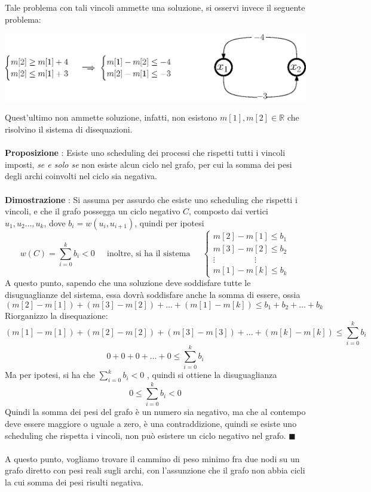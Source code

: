\documentclass[12pt, letterpaper]{article}
\newcommand{\acc}{\\\hphantom{}\\}
\begin{document}
Tale problema con tali vincoli ammette una soluzione, si osservi invece il seguente problema:\begin{center}
    \includegraphics[width=1\textwidth ]{images/scheduling3.eps}
\end{center}
Quest'ultimo non ammette soluzione, infatti, non esistono $m[1],m[2]\in \mathbb{R}$ che risolvino il sistema di 
disequazioni.\acc 
\textbf{Proposizione} : Esiste uno scheduling dei processi che rispetti tutti i vincoli imposti, \textit{se e solo se} non 
esiste alcun ciclo nel grafo, per cui la somma dei pesi degli archi coinvolti nel ciclo sia negativa.\acc 
\textbf{Dimostrazione} : Si assuma per assurdo che esiste uno scheduling che rispetti i vincoli, e che il grafo 
possegga un ciclo negativo $C$, composto dai vertici $u_1,u_2\dots,u_k$, dove $b_i = w(u_i,u_{i+1})$, quindi per 
ipotesi $$w(C) = \displaystyle \sum_{i=0}^k b_i < 0 \;\;\;\;\text{ inoltre, si ha il sistema }\;\;\;\;\begin{cases}
    m[2]-m[1]\le b_1\\
    m[3]-m[2]\le b_2\\
    \vdots\;\;\;\;\;\;\;\;\;\;\;\;\;\;\;\;\;\vdots \\
    m[1]-m[k]\le b_k
\end{cases} $$
A questo punto, sapendo che una soluzione deve soddisfare tutte le disuguaglianze del sistema, essa dovrà soddisfare anche 
la somma di essere, ossia 
$$ 
(m[2]-m[1])+ (m[3]-m[2]) + \dots + (m[1]-m[k]) \le b_1 + b_2 + \dots + b_k
$$
Riorganizzo la disequazione:
$$ 
(m[1]-m[1]) + (m[2]-m[2])+ (m[3]-m[3]) + \dots + (m[k]-m[k]) \le \sum_{i=0}^k b_i
$$
$$ 
0 + 0 +0 + \dots + 0 \le \sum_{i=0}^k b_i
$$
Ma per ipotesi, si ha che $ \sum_{i=0}^k b_i<0$ , quindi si ottiene la disuguaglianza 
$$ 0\le  \sum_{i=0}^k b_i < 0$$
Quindi la somma dei pesi del grafo è un numero sia negativo, ma che al contempo deve essere maggiore o uguale a zero, è 
una contraddizione, quindi se esiste uno scheduling che rispetta i vincoli, non può esistere un ciclo negativo nel grafo. $\blacksquare$\acc 
A questo punto, vogliamo trovare il cammino di peso minimo fra due nodi su un grafo diretto con pesi reali sugli archi, con 
l'assunzione che il grafo non abbia cicli la cui somma dei pesi risulti negativa.\acc 
\end{document}
